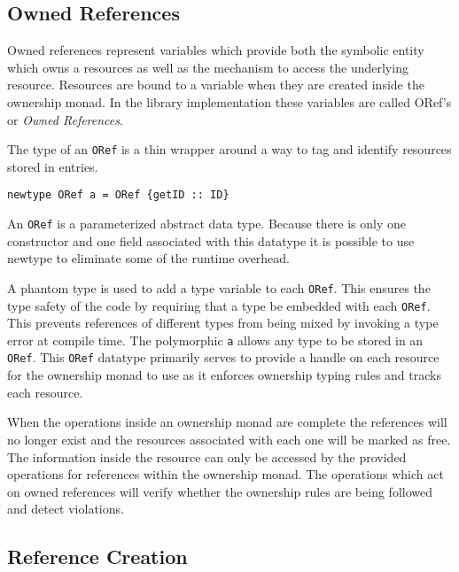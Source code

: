 \documentclass[onehalf,11pt]{beavtex}
\begin{document}
\subsection{Owned References}

Owned references represent variables which provide both the symbolic entity
which owns a resources as well as the mechanism to access the underlying resource.
Resources are bound to a variable when they are created inside the ownership
monad. In the library implementation these variables are called ORef's or
\textit{Owned References}.

The type of an \texttt{ORef} is a thin wrapper around a way to tag and identify
resources stored in entries.

\begin{verbatim}
newtype ORef a = ORef {getID :: ID}
\end{verbatim}

An \texttt{ORef} is a parameterized abstract data type. Because there is only
one constructor and one field associated with this datatype it is possible to
use newtype to eliminate some of the runtime overhead.

A phantom type is used to add a type variable to each \texttt{ORef}. This
ensures the type safety of the code by requiring that a type be embedded
with each \texttt{ORef}.
This prevents references of different types from being mixed by invoking a
type error at compile time.
The polymorphic \texttt{a} allows any type to be stored in an \texttt{ORef}.
This \texttt{ORef} datatype primarily serves to provide a handle on each
resource for the ownership monad to use as it enforces ownership typing rules
and tracks each resource.

When the operations inside an ownership monad are complete the references
will no longer exist and the resources associated with each one will be marked
as free.
The information inside the resource can only be accessed by the provided
operations for references within the ownership monad.
The operations which act on owned references will verify whether the ownership
rules are being followed and detect violations.


\subsection{Reference Creation}
\end{document}
